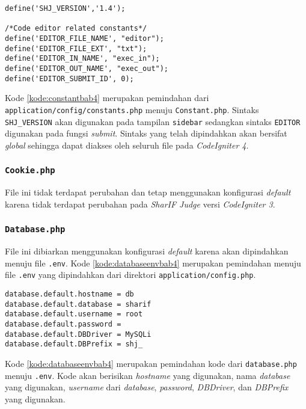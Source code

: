 \begin{lstlisting}[caption=Pemindahan kode pada \textit{Constant}, label=kode:constantbab4]
define('SHJ_VERSION','1.4');

/*Code editor related constants*/
define('EDITOR_FILE_NAME', "editor");
define('EDITOR_FILE_EXT', "txt");
define('EDITOR_IN_NAME', "exec_in");
define('EDITOR_OUT_NAME', "exec_out");
define('EDITOR_SUBMIT_ID', 0);
\end{lstlisting}

Kode \ref{kode:constantbab4} merupakan pemindahan dari \texttt{application/config/constants.php} menuju \texttt{Constant.php}. Sintaks \texttt{SHJ\_VERSION} akan digunakan pada tampilan \texttt{sidebar} sedangkan sintaks \texttt{EDITOR} digunakan pada fungsi \textit{submit}. Sintaks yang telah dipindahkan akan bersifat \textit{global} sehingga dapat diakses oleh seluruh file pada \textit{CodeIgniter 4}.

\subsubsection{\texttt{Cookie.php}}
File ini tidak terdapat perubahan dan tetap menggunakan konfigurasi \textit{default} karena tidak terdapat perubahan pada \textit{SharIF Judge} versi \textit{CodeIgniter 3}.

\subsubsection{\texttt{Database.php}}
File ini dibiarkan menggunakan konfigurasi \textit{default} karena akan dipindahkan menuju file \texttt{.env}. Kode \ref{kode:databaseenvbab4} merupakan pemindahan menuju file \texttt{.env} yang dipindahkan dari direktori \texttt{application/config.php}.

\begin{lstlisting}[caption=Pemindahan \texttt{app/config/database.php} menuju \texttt{.env}, label=kode:databaseenvbab4]
database.default.hostname = db
database.default.database = sharif
database.default.username = root
database.default.password = 
database.default.DBDriver = MySQLi
database.default.DBPrefix = shj_
\end{lstlisting}

Kode \ref{kode:databaseenvbab4} merupakan pemindahan kode dari \texttt{database.php} menuju \texttt{.env}. Kode akan berisikan \textit{hostname} yang digunakan, nama \textit{database} yang digunakan, \textit{username} dari \textit{database}, \textit{password}, \textit{DBDriver}, dan \textit{DBPrefix} yang digunakan.


